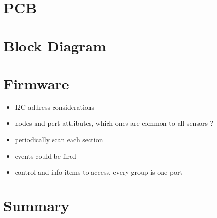 \section{PCB}

\section{Block Diagram}



\section{Firmware}

\begin{itemize}
\item I2C address considerations
\item nodes and port attributes, which ones are common to all sensors ?
\item periodically scan each section
\item events could be fired
\item control and info items to access, every group is one port
\end{itemize}

\section{Summary}

